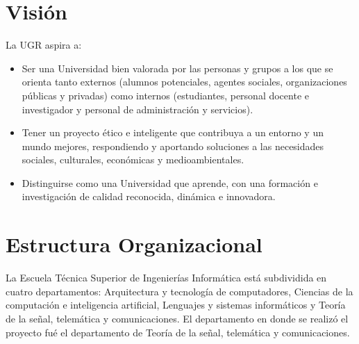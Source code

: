 \section{Visión}

La UGR aspira a: \cite{ugrMV}
\begin{itemize}
\item Ser una Universidad bien valorada por las personas y grupos a los que se orienta tanto externos (alumnos potenciales, agentes sociales, organizaciones públicas y privadas) como internos (estudiantes, personal docente e investigador y personal de administración y servicios).
\item Tener un proyecto ético e inteligente que contribuya a un entorno y un mundo mejores, respondiendo y aportando soluciones a las necesidades sociales, culturales, económicas y medioambientales.
\item Distinguirse como una Universidad que aprende, con una formación e investigación de calidad reconocida, dinámica e innovadora.
\end{itemize}

\section{Estructura Organizacional}

La Escuela Técnica Superior de Ingenierías Informática está subdividida en cuatro departamentos: Arquitectura y tecnología de computadores, Ciencias de la computación e inteligencia artificial,  Lenguajes y sistemas informáticos y Teoría de la señal, telemática y comunicaciones.\cite{etsiiDepart} 
El departamento en donde se realizó el proyecto fué el departamento de Teoría de la señal, telemática y comunicaciones.


